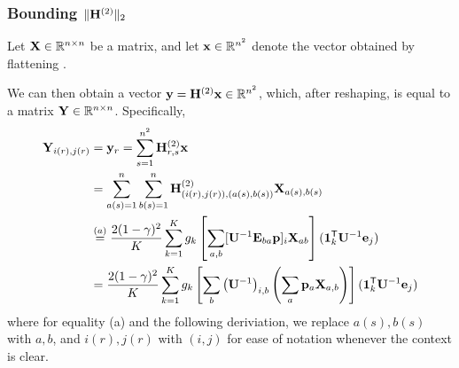 \subsubsection{Bounding $\|\mathbf{{H}}^{(2)}\|_2$} 
Let $\mathbf{{X}} \in \mathbb{R}^{n\times n}$ be a matrix, and let $\mathbf{{x}} \in \mathbb{R}^{n^2}$ denote the vector obtained by flattening \Xmatrix.

We can then obtain a vector $\mathbf{{y}} = \mathbf{{H}}^{(2)} \mathbf{{x}} \in \mathbb{R}^{n^2}$, which, after reshaping, is equal to a matrix $\mathbf{{Y}} \in \mathbb{R}^{n\times n}$. Specifically, 
\begin{align*}
	 \mathbf{{Y}}_{i(r), j(r)} &= \mathbf{{y}}_r  =\sum_{s = 1}^{n^2} \mathbf{{H}}^{(2)}_{r,s} \mathbf{{x}}  \\
	&= \sum_{a(s)=1}^{n} \sum_{b(s)=1}^{n} \mathbf{{H}}^{(2)}_{(i(r),j(r)),(a(s),b(s))} \mathbf{{X}}_{a(s),b(s)} \\
	& \stackrel{(a)}{=} \frac{2(1-\gamma)^2}{K} \sum_{k=1}^{K} g_k \left[ \sum_{a, b} [\mathbf{{U}}^{-1} \mathbf{{E}}_{b a} \mathbf{{p}}]_i \mathbf{{X}}_{a b} \right] (\mathbf{{1}}_{k}^{\mathsf{T}} \mathbf{{U}}^{-1} \mathbf{{e}}_{j})	\\
	&=  \frac{2(1-\gamma)^2}{K} \sum_{k=1}^{K} g_k \left[ \sum_{ b} \left(\mathbf{{U}}^{-1} \right)_{i,b} \left(\sum_a \mathbf{{p}}_a \mathbf{{X}}_{a,b} \right) \right] (\mathbf{{1}}_{k}^{\mathsf{T}} \mathbf{{U}}^{-1} \mathbf{{e}}_{j})
\end{align*}
where for equality (a) and the following deriviation, we replace $a(s), b(s)$ with $a,b$, and $i(r), j(r)$ with $(i,j)$ for ease of notation whenever the context is clear.

